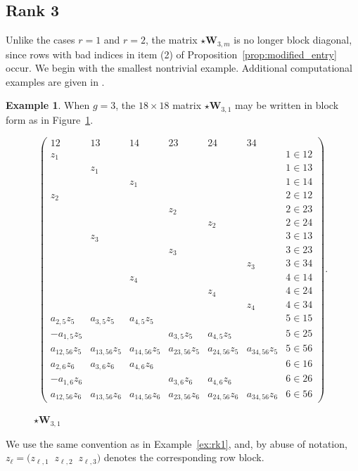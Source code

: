 \documentclass[12pt, letterpaper]{amsart}
\theoremstyle{definition}
\newtheorem{example}[theorem]{Example}
\newcommand{\bW}{\mathbf{W} }
\begin{document}
\subsection{Rank 3}\label{ssec:rank3}

Unlike the cases \(r=1\) and \(r=2\), the matrix \(\star\bW_{3,m}\) is no longer block diagonal, since rows with bad indices in item (2) of Proposition~\ref{prop:modified_entry} occur. We begin with the smallest nontrivial example. Additional computational examples are given in \cite{JLM26}.

\begin{example}\label{ex:rk3_first}
When \(g=3\), the \(18 \times 18\) matrix \(\star\bW_{3,1}\) may be written in block form as in Figure~\ref{fig:W31}.
\begin{figure}[!ht]
\[
\left( \begin{array}{cccccc|c}
  12 & 13 & 14 & 23 & 24 & 34 & \\
  \hline z_1 &&&&&& 1\in 12\\
  &z_1&&&&& 1\in 13\\
  &&z_1&&&& 1\in 14\\
  z_2&&&&&& 2\in 12\\
  &&&z_2&&& 2\in 23\\
  &&&&z_2&& 2\in 24\\
  &z_3&&&&& 3\in 13\\
  &&&z_3&&& 3\in 23\\
  &&&&&z_3& 3\in 34\\
  &&z_4&&&& 4\in 14\\
  &&&&z_4&& 4\in 24\\
  &&&&&z_4& 4\in 34\\
  a_{2,5}z_5 & a_{3,5}z_5 & a_{4,5}z_5 &&&& 5\in 15\\
  -a_{1,5}z_5 &&& a_{3,5}z_5 & a_{4,5}z_5 && 5\in 25\\
  a_{12,56}z_5 & a_{13,56}z_5 & a_{14,56}z_5 & a_{23,56}z_5 & a_{24,56}z_5 & a_{34,56}z_5 & 5\in 56\\
  a_{2,6}z_6 & a_{3,6}z_6 & a_{4,6}z_6 &&&& 6\in 16\\
  -a_{1,6}z_6 &&& a_{3,6}z_6 & a_{4,6}z_6 && 6\in 26\\
  a_{12,56}z_6 & a_{13,56}z_6 & a_{14,56}z_6 & a_{23,56}z_6 & a_{24,56}z_6 & a_{34,56}z_6 & 6\in 56
\end{array} \right).
\]
\caption{\(\star\bW_{3,1}\)}\label{fig:W31}
\end{figure}

We use the same convention as in Example~\ref{ex:rk1}, and, by abuse of notation, \( z_\ell=\bigl(z_{\ell,1}\;\;z_{\ell,2}\;\;z_{\ell,3}\bigr) \) denotes the corresponding row block.
\end{example}
\end{document}
